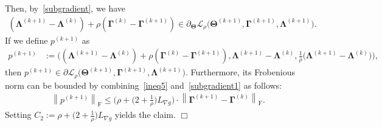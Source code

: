 \documentclass[alpha-refs]{wiley-article}
\begin{document}
Then, by~\eqref{subgradient}, we have
\begin{align*}
    (\boldsymbol{\Lambda}^{(k+1)} - \boldsymbol{\Lambda}^{(k)}) + \rho (\boldsymbol{\Gamma}^{(k)} - \boldsymbol{\Gamma}^{(k+1)} )
    \in \partial_{\boldsymbol{\Theta}}\mathcal{L}_{\rho} \big( \boldsymbol{\Theta}^{(k+1)},\boldsymbol{\Gamma}^{(k+1)},\boldsymbol{\Lambda}^{(k+1)} \big).
\end{align*}
If we define $p^{(k+1)}$ as
\begin{align} \label{subgradient1}
    p^{(k+1)} 
    &:=\bigg( (\boldsymbol{\Lambda}^{(k+1)} - \boldsymbol{\Lambda}^{(k)}) + \rho (\boldsymbol{\Gamma}^{(k)} - \boldsymbol{\Gamma}^{(k+1)} ),  
    \boldsymbol{\Lambda}^{(k+1)} - \boldsymbol{\Lambda}^{(k)}, \frac{1}{\rho} \big( \boldsymbol{\Lambda}^{(k+1)} - \boldsymbol{\Lambda}^{(k)} \big) \bigg),
\end{align}
then $p^{(k+1)}\in\partial \mathcal{L}_{\rho} \big( \boldsymbol{\Theta}^{(k+1)},\boldsymbol{\Gamma}^{(k+1)},\boldsymbol{\Lambda}^{(k+1)} \big)$.
Furthermore, its Frobenious norm can be bounded by combining~\eqref{ineq5} and~\eqref{subgradient1} as follows:
\begin{align*}
    \left\| p^{(k+1)} \right\|_{\text{F}} \leq 
    \bigg( \rho + \big(2+\frac{1}{\rho}\big)L_{\nabla g} \bigg) \cdot 
    \left\| \boldsymbol{\Gamma}^{(k+1)} - \boldsymbol{\Gamma}^{(k)} \right\|_{\text{F}}.
\end{align*}
Setting $C_{2}:=\rho + \big(2+\frac{1}{\rho}\big)L_{\nabla g}$ yields the claim.
\qquad \qquad \qquad \qquad \qquad \qquad \qquad \qquad \qquad \qquad \qquad \qquad \qquad \qquad \qquad \qquad $\Box$

\end{document}
